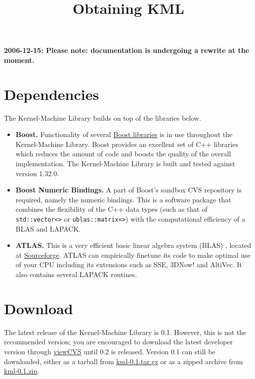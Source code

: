 \documentclass{article}
\begin{document}
\title{Obtaining KML}
\maketitle

\textbf{2006-12-15: Please note: documentation is undergoing a rewrite at the moment.}

\section*{Dependencies}

The Kernel-Machine Library builds on top of the libraries below.

\begin{itemize}
\item \textbf{Boost.} Functionality of several \href{http://www.boost.org}{Boost libraries} is 
in use throughout the Kernel-Machine Library. Boost provides
an excellent set of C++ libraries which reduces the amount of code and boosts the quality of the overall implementation.
The Kernel-Machine Library is built and tested against version 1.32.0.

\item \textbf{Boost Numeric Bindings.} A part of Boost's sandbox CVS repository is required, namely the numeric bindings. 
This is a software package that combines the flexibility of the C++ data types (such as that of 
\texttt{std::vector<>} or \texttt{ublas::matrix<>}) with the computational 
efficiency of a BLAS and LAPACK.  

\item \textbf{ATLAS.} This is a very efficient basic linear algebra system (BLAS) \citep{whaley01automated}, located at
\href{http://math-atlas.sourceforge.net}{Sourceforge}. ATLAS can empirically finetune its code to make optimal use of your CPU 
including its extensions such as SSE, 3DNow! and AltiVec. It also contains several LAPACK routines. 

\end{itemize}

\section*{Download}
\label{section:download}

The latest release of the Kernel-Machine Library is 0.1. However, this is not the recommended version; you are encouraged to
download the latest developer version through  
\href{http://www.terborg.net/cgi-bin/viewcvs.cgi/trunk/kml/}{viewCVS} until 0.2 is released. 
Version 0.1 can still be downloaded, either as a tarball 
from \href{research/kml/kml-0.1.tar.gz}{kml-0.1.tar.gz} or as a zipped archive
from \href{research/kml/kml-0.1.zip}{kml-0.1.zip}.
\end{document}

